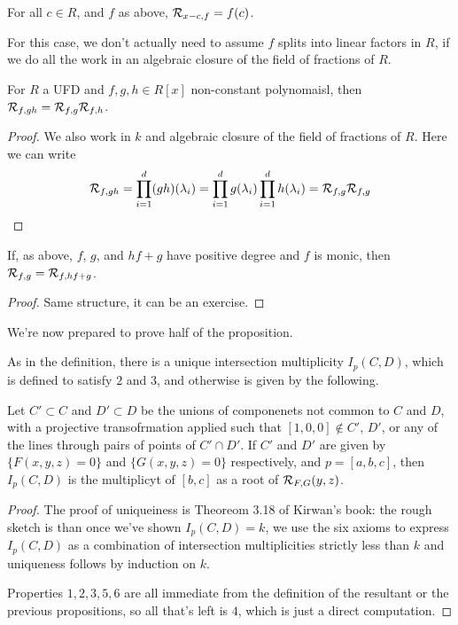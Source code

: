 \documentclass{article}
\begin{document}
\begin{corollary}
    For all $c\in R$, and $f$ as above, $\mathcal{R}_{x-c,f}=f(c)$.
\end{corollary}

For this case, we don't actually need to assume $f$ splits into linear factors in $R$, if we do all the work in an algebraic closure of the field of fractions of $R$.

\begin{corollary}
    For $R$ a UFD and $f,g,h\in R[x]$ non-constant polynomaisl, then $\mathcal{R}_{f,gh} = \mathcal{R}_{f,g}\mathcal{R}_{f,h}$.\begin{proof}
        We also work in $k$ and algebraic closure of the field of fractions of $R$. Here we can write \[
        \mathcal{R}_{f,gh} = \prod_{i=1}^d (gh)(\lambda_i) = \prod_{i=1}^d g(\lambda_i)\prod_{i=1}^d h(\lambda_i) = \mathcal{R}_{f,g}\mathcal{R}_{f,g}\qedhere
        \]
    \end{proof}
\end{corollary}

\begin{corollary}
    If, as above, $f$, $g$, and $hf+g$ have positive degree and $f$ is monic, then $\mathcal{R}_{f,g}=\mathcal{R}_{f,hf+g}$.\begin{proof} 
        Same structure, it can be an exercise.
    \end{proof}
\end{corollary}

We're now prepared to prove half of the proposition.

\begin{theorem}
    As in the definition, there is a unique intersection multiplicity $I_p(C,D)$, which is defined to satisfy $2$ and $3$, and otherwise is given by the following.

    Let $C'\subset C$ and $D'\subset D$ be the unions of componenets not common to $C$ and $D$, with a projective transofrmation applied such that $[1,0,0]\not\in C'$, $D'$, or any of the lines through pairs of points of $C'\cap D'$. If $C'$ and $D'$ are given by $\{F(x,y,z)=0\}$ and $\{G(x,y,z)=0\}$ respectively, and $p=[a,b,c]$, then $I_p(C,D)$ is the multiplicyt of $[b,c]$ as a root of $\mathcal{R}_{F,G}(y,z)$.

    \begin{proof}
        The proof of uniqueiness is Theoreom 3.18 of Kirwan's book: the rough sketch is than once we've shown $I_p(C,D)=k$, we use the six axioms to express $I_p(C,D)$ as a combination of intersection multiplicities strictly less than $k$ and uniqueness follows by induction on $k$.

        Properties $1,2,3,5,6$ are all immediate from the definition of the resultant or the previous propositions, so all that's left is $4$, which is just a direct computation.
    \end{proof}
\end{theorem}
\end{document}
